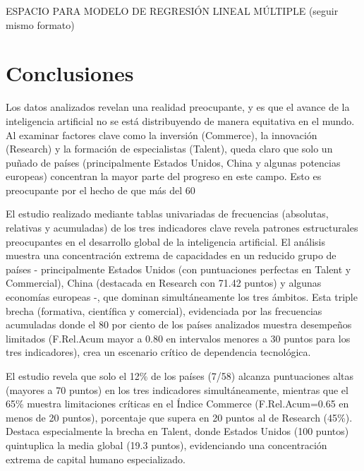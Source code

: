\documentclass[
]{article}
\begin{document}
\begin{multicols}{2}
ESPACIO PARA MODELO DE REGRESIÓN LINEAL MÚLTIPLE (seguir mismo formato)

\section{Conclusiones}

Los datos analizados revelan una realidad preocupante, y es que el avance de la inteligencia artificial no se está distribuyendo de manera equitativa en el mundo. Al examinar factores clave como la inversión (Commerce), la innovación (Research) y la formación de especialistas (Talent), queda claro que solo un puñado de países (principalmente Estados Unidos, China y algunas potencias europeas) concentran la mayor parte del progreso en este campo. Esto es preocupante por el hecho de que más del 60%

El estudio realizado mediante tablas univariadas de frecuencias (absolutas, relativas y acumuladas) de los tres indicadores clave revela patrones estructurales preocupantes en el desarrollo global de la inteligencia artificial. El análisis muestra una concentración extrema de capacidades en un reducido grupo de países - principalmente Estados Unidos (con puntuaciones perfectas en Talent y Commercial), China (destacada en Research con 71.42 puntos) y algunas economías europeas -, que dominan simultáneamente los tres ámbitos. Esta triple brecha (formativa, científica y comercial), evidenciada por las frecuencias acumuladas donde el 80 por ciento de los países analizados muestra desempeños limitados (F.Rel.Acum mayor a 0.80 en intervalos menores a 30 puntos para los tres indicadores), crea un escenario crítico de dependencia tecnológica.

El estudio revela que solo el 12\% de los países (7/58) alcanza puntuaciones altas (mayores a 70 puntos) en los tres indicadores simultáneamente, mientras que el 65\% muestra limitaciones críticas en el Índice Commerce (F.Rel.Acum=0.65 en menos de 20 puntos), porcentaje que supera en 20 puntos al de Research (45\%). Destaca especialmente la brecha en Talent, donde Estados Unidos (100 puntos) quintuplica la media global (19.3 puntos), evidenciando una concentración extrema de capital humano especializado.


\end{multicols}
\end{document}

